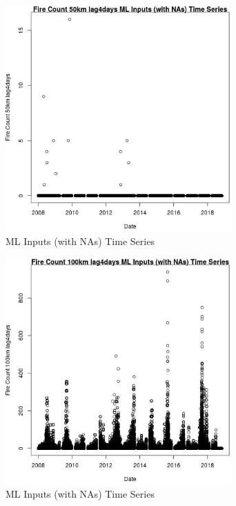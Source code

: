\begin{figure} 
\centering  
\includegraphics[width=0.77\textwidth]{Code_Outputs/Report_ML_input_PM25_Step4_part_e_de_duplicated_aves_compiled_2019-05-20wNAs_Fire_Count_50km_lag4daysvDate.jpg} 
\caption{\label{fig:Report_ML_input_PM25_Step4_part_e_de_duplicated_aves_compiled_2019-05-20wNAsFire_Count_50km_lag4daysvDate}ML Inputs (with NAs) Time Series} 
\end{figure} 
 

\begin{figure} 
\centering  
\includegraphics[width=0.77\textwidth]{Code_Outputs/Report_ML_input_PM25_Step4_part_e_de_duplicated_aves_compiled_2019-05-20wNAs_Fire_Count_100km_lag4daysvDate.jpg} 
\caption{\label{fig:Report_ML_input_PM25_Step4_part_e_de_duplicated_aves_compiled_2019-05-20wNAsFire_Count_100km_lag4daysvDate}ML Inputs (with NAs) Time Series} 
\end{figure} 
 

